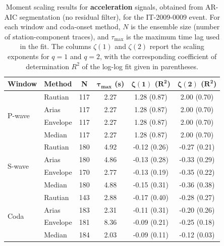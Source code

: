 \begin{table}[H]
\centering
\small
\begin{tabular}{llcccc}
\toprule
\textbf{Window} & \textbf{Method} & \textbf{N} & $\bm{\tau_{\max}}$ \textbf{(s)} & $\bm{\zeta(1)}$ \textbf{(}$\bm{R^2}$\textbf{)} & $\bm{\zeta(2)}$ \textbf{(}$\bm{R^2}$\textbf{)} \\
\midrule
\multirow{4}{*}{P-wave}
& Rautian & 117 & 2.27 & 1.28 (0.87) & 2.00 (0.70) \\
& Arias & 117 & 2.27 & 1.28 (0.87) & 2.00 (0.70) \\
& Envelope & 117 & 2.27 & 1.28 (0.87) & 2.00 (0.70) \\
& Median & 117 & 2.27 & 1.28 (0.87) & 2.00 (0.70) \\
\midrule
\multirow{4}{*}{S-wave}
& Rautian & 180 & 4.92 & -0.12 (0.26) & -0.27 (0.21) \\
& Arias & 180 & 4.86 & -0.13 (0.28) & -0.33 (0.29) \\
& Envelope & 170 & 2.77 & -0.13 (0.19) & -0.35 (0.22) \\
& Median & 180 & 4.88 & -0.15 (0.31) & -0.36 (0.38) \\
\midrule
\multirow{4}{*}{Coda}
& Rautian & 143 & 2.88 & -0.17 (0.40) & -0.28 (0.27) \\
& Arias & 183 & 2.31 & -0.11 (0.31) & -0.20 (0.26) \\
& Envelope & 181 & 8.36 & -0.09 (0.21) & -0.25 (0.18) \\
& Median & 184 & 2.03 & -0.09 (0.11) & -0.12 (0.03) \\
\bottomrule
\end{tabular}
\caption{Moment scaling results for \textbf{acceleration} signals, obtained from AR-AIC segmentation (no residual filter), for the IT-2009-0009 event. For each window and coda-onset method, $N$ is the ensemble size (number of station-component traces), and $\tau_{\max}$ is the maximum time lag used in the fit. The columns $\zeta(1)$ and $\zeta(2)$ report the scaling exponents for $q=1$ and $q=2$, with the corresponding coefficient of determination $R^2$ of the log-log fit given in parentheses.}
\label{tab:ar_aic_scaling_acc_nothresh_laquila}
\end{table}